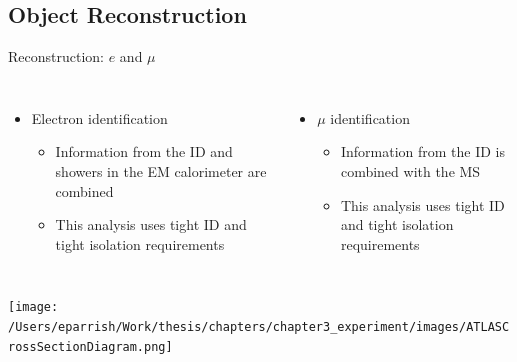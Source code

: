 \documentclass[aspectratio=169,xcolor=table]{beamer}
\begin{document}
  \subsection{Object Reconstruction}

    \begin{frame}[t]{Reconstruction: $e$ and $\mu$}
      \begin{columns}[t]
        \begin{itemize}
          \item Electron identification
          \begin{itemize}
            \item Information from the ID and showers in the EM calorimeter are combined
            \item This analysis uses tight ID and tight isolation requirements
          \end{itemize}
        \end{itemize}

        \begin{itemize}
          \item $\mu$ identification
          \begin{itemize}
            \item Information from the ID is combined with the MS
            \item This analysis uses tight ID and tight isolation requirements
          \end{itemize}
        \end{itemize}
      \end{columns}
      \centering
      \texttt{[image: /Users/eparrish/Work/thesis/chapters/chapter3\_experiment/images/ATLASCrossSectionDiagram.png]}
      
    \end{frame}
\end{document}
